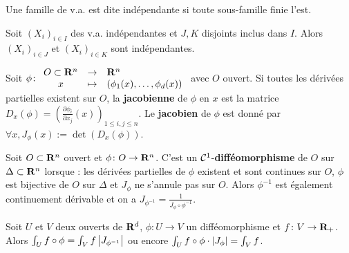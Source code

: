 \begin{defn}
	Une famille de v.a. est dite indépendante si toute sous-famille finie l'est.
\end{defn}

\begin{lem}
	Soit $(X_i)_{i \in I}$ des v.a. indépendantes et $J, K$ disjoints inclus dans $I$.
	Alors $(X_i)_{i \in J}$ et $(X_i)_{i \in K}$ sont indépendantes.
\end{lem}

\begin{defn}
	Soit $\phi \colon \begin{array}{ccl}
		O \subset \mathbf{R}^n & \to & \mathbf{R}^n \\
		x & \mapsto & (\phi_1(x),\ldots,\phi_d(x))
		\end{array}$
	avec $O$ ouvert.
	Si toutes les dérivées partielles existent sur $O$, la \textbf{jacobienne} de $\phi$ en $x$ est la matrice $D_x(\phi) = \left( \frac{\partial \phi_i}{\partial x_j}(x) \right)_{1 \leq i,j \leq n}$.
	Le \textbf{jacobien} de $\phi$ est donné par $\forall x, J_{\phi}(x) := \det(D_x(\phi))$.
\end{defn}

\begin{defn}
	Soit $O \subset \mathbf{R}^n$ ouvert et $\phi \colon O \to \mathbf{R}^n$.
	C'est un $\mathcal{C}^1$-\textbf{difféomorphisme} de $O$ sur $\Delta \subset \mathbf{R}^n$ lorsque : les dérivées partielles de $\phi$ existent et sont continues sur $O$, $\phi$ est bijective de $O$ sur $\Delta$ et $J_{\phi}$ ne s'annule pas sur $O$.
	Alors $\phi^{-1}$ est également continuement dérivable et on a $J_{\phi^{-1}} = \frac{1}{J_{\phi} \circ \phi^{-1}}$.
\end{defn}

\begin{thm}
	Soit $U$ et $V$ deux ouverts de $\mathbf{R}^d$, $\phi \colon U \to V$ un difféomorphisme et $f \colon V \to \mathbf{R}_+$.
	Alors $\int_U f \circ \phi = \int_V f \left\lvert J_{\phi^{-1}}\right\rvert$ ou encore $\int_U f \circ \phi \cdot \left\lvert J_{\phi}\right\rvert = \int_V f$.
\end{thm}
